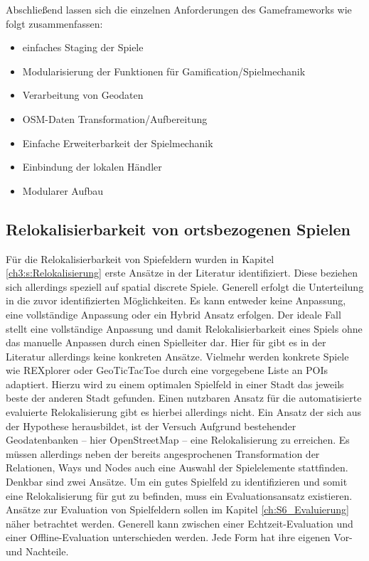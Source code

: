 Abschließend lassen sich die einzelnen Anforderungen des Gameframeworks wie folgt zusammenfassen:

\begin{itemize}
\item einfaches Staging der Spiele
\item Modularisierung der Funktionen für Gamification/Spielmechanik
\item Verarbeitung von Geodaten
\item OSM-Daten Transformation/Aufbereitung
\item Einfache Erweiterbarkeit der Spielmechanik
\item Einbindung der lokalen Händler
\item Modularer Aufbau
\end{itemize}


\subsection*{Relokalisierbarkeit von ortsbezogenen Spielen}

Für die Relokalisierbarkeit von Spiefeldern wurden in Kapitel \ref{ch3:s:Relokalisierung} erste Ansätze in der Literatur identifiziert. Diese beziehen sich allerdings speziell auf spatial discrete Spiele.
Generell erfolgt die Unterteilung in die zuvor identifizierten Möglichkeiten.
Es kann entweder keine Anpassung, eine vollständige Anpassung oder ein Hybrid Ansatz erfolgen. Der ideale Fall stellt eine vollständige Anpassung und damit Relokalisierbarkeit eines Spiels ohne das manuelle Anpassen durch einen Spielleiter dar. Hier für gibt es in der Literatur allerdings keine konkreten Ansätze. Vielmehr werden konkrete Spiele wie REXplorer \cite{Ballagas.2007} oder GeoTicTacToe \cite{Kiefer.2007} durch eine vorgegebene Liste an POIs adaptiert. Hierzu wird zu einem optimalen Spielfeld in einer Stadt das jeweils beste der anderen Stadt gefunden.
Einen nutzbaren Ansatz für die automatisierte evaluierte Relokalisierung gibt es hierbei allerdings nicht.
Ein Ansatz der sich aus der Hypothese herausbildet, ist der Versuch Aufgrund bestehender Geodatenbanken -- hier OpenStreetMap -- eine Relokalisierung zu erreichen. Es müssen allerdings neben der bereits angesprochenen Transformation der Relationen, Ways und Nodes auch eine Auswahl der Spielelemente stattfinden. Denkbar sind zwei Ansätze. Um ein \glqq gutes Spielfeld\grqq{} zu identifizieren und somit eine Relokalisierung für gut zu befinden, muss ein Evaluationsansatz existieren. Ansätze zur Evaluation von Spielfeldern sollen im Kapitel \ref{ch:S6_Evaluierung} näher betrachtet werden. Generell kann zwischen einer Echtzeit-Evaluation und einer Offline-Evaluation unterschieden werden. Jede Form hat ihre eigenen Vor- und Nachteile.


